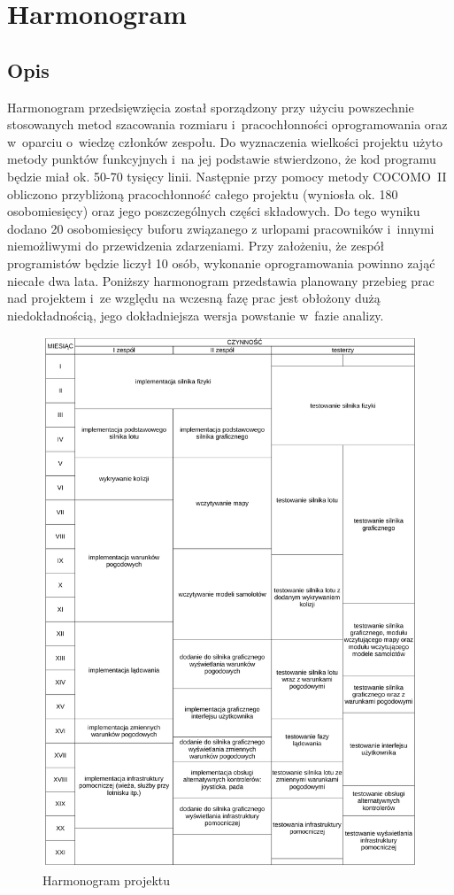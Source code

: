 \documentclass{mwrep}
\begin{document}
\chapter{Harmonogram}

\section{Opis}
Harmonogram przedsięwzięcia został sporządzony przy użyciu powszechnie stosowanych metod szacowania rozmiaru i~pracochłonności oprogramowania oraz w~oparciu o~wiedzę członków zespołu. Do wyznaczenia wielkości projektu użyto metody punktów funkcyjnych i~na jej podstawie stwierdzono, że kod programu będzie miał ok. 50-70 tysięcy linii. Następnie przy pomocy metody COCOMO~II obliczono przybliżoną pracochłonność całego projektu (wyniosła ok. 180 osobomiesięcy) oraz jego poszczególnych części składowych. Do tego wyniku dodano 20 osobomiesięcy buforu związanego z urlopami pracowników i~innymi niemożliwymi do przewidzenia zdarzeniami. Przy założeniu, że zespół programistów będzie liczył 10 osób, wykonanie oprogramowania powinno zająć niecałe dwa lata.
Poniższy harmonogram przedstawia planowany przebieg prac nad projektem i~ze względu na wczesną fazę prac jest obłożony dużą niedokładnością, jego dokładniejsza wersja powstanie w~fazie analizy.


\begin{figure}[!h]
	\centerline{\includegraphics*[scale=0.8]{harmonogram-tabela.pdf}}
	\caption{Harmonogram projektu}
\end{figure}
\end{document}
